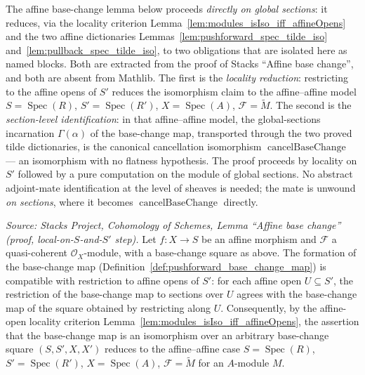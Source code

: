 The affine base-change lemma below proceeds \emph{directly on global sections}: it
reduces, via the locality criterion
Lemma~\ref{lem:modules_isIso_iff_affineOpens} and the two affine dictionaries
Lemmas~\ref{lem:pushforward_spec_tilde_iso} and~\ref{lem:pullback_spec_tilde_iso},
to two obligations that are isolated here as named blocks. Both are extracted from
the proof of Stacks ``Affine base change'', and both are absent from Mathlib. The
first is the \emph{locality reduction}: restricting to the affine opens of \(S'\)
reduces the isomorphism claim to the affine--affine model
\(S = \operatorname{Spec}(R)\), \(S' = \operatorname{Spec}(R')\),
\(X = \operatorname{Spec}(A)\), \(\mathcal{F} = \widetilde{M}\). The second is the
\emph{section-level identification}: in that affine--affine model, the global-sections
incarnation \(\Gamma(\alpha)\) of the base-change map, transported through the two
proved tilde dictionaries, is the canonical cancellation isomorphism
\(\operatorname{cancelBaseChange}\) — an isomorphism with no flatness hypothesis.
The proof proceeds by locality on \(S'\) followed by a pure computation on the module
of global sections. No abstract adjoint-mate identification at the level of sheaves is
needed; the mate is unwound \emph{on sections}, where it becomes
\(\operatorname{cancelBaseChange}\) directly.

\begin{lemma}


  \label{lem:base_change_map_affine_local}
  \textit{Source: Stacks Project, Cohomology of Schemes, Lemma ``Affine base
  change'' (proof, local-on-\(S\)-and-\(S'\) step).}
  Let \(f : X \to S\) be an affine morphism and \(\mathcal{F}\) a quasi-coherent
  \(\mathcal{O}_X\)-module, with a base-change square as above. The formation of the
  base-change map (Definition~\ref{def:pushforward_base_change_map}) is compatible
  with restriction to affine opens of \(S'\): for each affine open \(U \subseteq S'\), the
  restriction of the base-change map to sections over \(U\) agrees with the
  base-change map of the square obtained by restricting along \(U\). Consequently,
  by the affine-open locality criterion
  Lemma~\ref{lem:modules_isIso_iff_affineOpens}, the assertion that the base-change
  map is an isomorphism over an arbitrary base-change square \((S, S', X, X')\)
  reduces to the affine--affine case \(S = \operatorname{Spec}(R)\),
  \(S' = \operatorname{Spec}(R')\), \(X = \operatorname{Spec}(A)\),
  \(\mathcal{F} = \widetilde{M}\) for an \(A\)-module \(M\).

\end{lemma}

